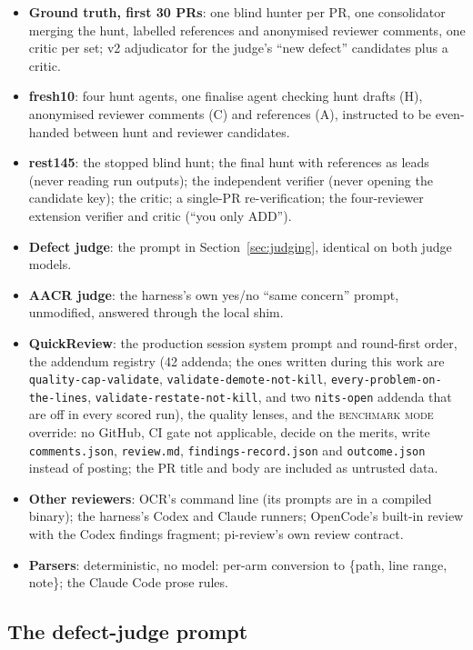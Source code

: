 \documentclass[11pt,a4paper]{article}
\newcommand{\qcr}{QuickReview}
\newcommand{\code}[1]{\texttt{#1}}
\begin{document}
\begin{itemize}
  \item \textbf{Ground truth, first 30 PRs}: one blind hunter per PR, one
  consolidator merging the hunt, labelled references and anonymised
  reviewer comments, one critic per set; v2 adjudicator for the judge's
  ``new defect'' candidates plus a critic.
  \item \textbf{fresh10}: four hunt agents, one finalise agent checking
  hunt drafts (H), anonymised reviewer comments (C) and references (A),
  instructed to be even-handed between hunt and reviewer candidates.
  \item \textbf{rest145}: the stopped blind hunt; the final hunt with
  references as leads (never reading run outputs); the independent
  verifier (never opening the candidate key); the critic; a single-PR
  re-verification; the four-reviewer extension verifier and critic (``you
  only ADD'').
  \item \textbf{Defect judge}: the prompt in Section~\ref{sec:judging},
  identical on both judge models.
  \item \textbf{AACR judge}: the harness's own yes/no ``same concern''
  prompt, unmodified, answered through the local shim.
  \item \textbf{\qcr{}}: the production session system prompt and
  round-first order, the addendum registry (42 addenda; the ones written
  during this work are \code{quality-cap-validate},
  \code{validate-demote-not-kill}, \code{every-problem-on-the-lines},
  \code{validate-restate-not-kill}, and two \code{nits-open} addenda that
  are off in every scored run), the quality lenses, and the
  \textsc{benchmark mode} override: no GitHub, CI gate not applicable,
  decide on the merits, write \code{comments.json}, \code{review.md},
  \code{findings-record.json} and \code{outcome.json} instead of posting;
  the PR title and body are included as untrusted data.
  \item \textbf{Other reviewers}: OCR's command line (its prompts are in a
  compiled binary); the harness's Codex and Claude runners; OpenCode's
  built-in review with the Codex findings fragment; pi-review's own
  review contract.
  \item \textbf{Parsers}: deterministic, no model: per-arm conversion to
  \{path, line range, note\}; the Claude Code prose rules.
\end{itemize}
\subsection*{The defect-judge prompt}
\label{app:judgeprompt}
\end{document}
